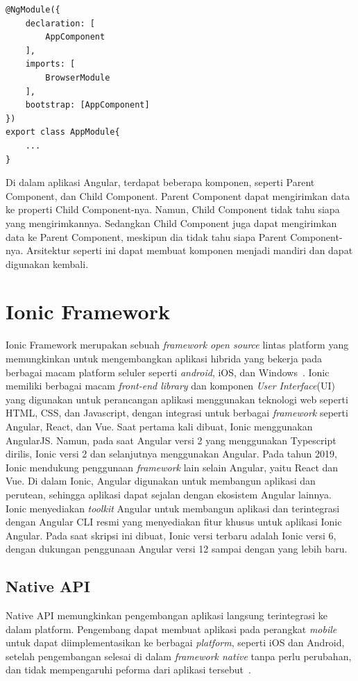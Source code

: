 \begin{itemize}
\begin{lstlisting}[label={lst:moduleComponent}, caption=Module dengan Komponen]
@NgModule({
	declaration: [
		AppComponent
	],
	imports: [
		BrowserModule	
	],
	bootstrap: [AppComponent]
})
export class AppModule{
	...
}
\end{lstlisting} 
\end{itemize}

Di dalam aplikasi Angular, terdapat beberapa komponen, seperti Parent Component, dan Child Component. Parent Component dapat mengirimkan data ke properti Child Component-nya. Namun, Child Component tidak tahu siapa yang mengirimkannya. Sedangkan Child Component juga dapat mengirimkan data ke Parent Component, meskipun dia tidak tahu siapa Parent Component-nya. Arsitektur seperti ini dapat membuat komponen menjadi mandiri dan dapat digunakan kembali.

\section{Ionic Framework}
\label{sec:ionicframework} 
 
Ionic Framework merupakan sebuah {\it framework open source} lintas platform yang memungkinkan untuk mengembangkan aplikasi hibrida yang bekerja pada berbagai macam platform seluler seperti {\it android}, iOS, dan Windows~\cite{waranashiwar:18:ionic}. Ionic memiliki berbagai macam \textit{front-end library} dan komponen \textit{User Interface}(UI) yang digunakan untuk  perancangan aplikasi menggunakan teknologi web seperti HTML, CSS, dan Javascript, dengan integrasi untuk berbagai \textit{framework} seperti Angular, React, dan Vue. Saat pertama kali dibuat, Ionic menggunakan AngularJS. Namun, pada saat Angular versi 2 yang menggunakan Typescript dirilis, Ionic versi 2 dan selanjutnya menggunakan Angular. Pada tahun 2019, Ionic mendukung penggunaan \textit{framework} lain selain Angular, yaitu React dan Vue. Di dalam Ionic, Angular digunakan untuk membangun aplikasi dan perutean, sehingga aplikasi dapat sejalan dengan ekosistem Angular lainnya. Ionic menyediakan {\it toolkit} Angular untuk membangun aplikasi dan terintegrasi dengan Angular CLI resmi yang menyediakan fitur khusus untuk aplikasi Ionic Angular. Pada saat skripsi ini dibuat, Ionic versi terbaru adalah Ionic versi 6, dengan dukungan penggunaan Angular versi 12 sampai dengan yang lebih baru.  

\subsection{Native API}
\label{subsec:nativeApi}
Native API memungkinkan pengembangan aplikasi langsung terintegrasi ke dalam platform. Pengembang dapat membuat aplikasi pada perangkat {\it mobile} untuk dapat diimplementasikan ke berbagai {\it platform}, seperti iOS dan Android, setelah pengembangan selesai di dalam {\it framework native} tanpa perlu perubahan, dan tidak mempengaruhi peforma dari aplikasi tersebut~\cite{griffith:17:mobile}. 

